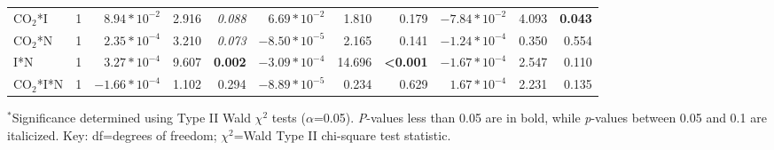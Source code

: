 \begin{landscape}
\begin{table}
{\begin{tabular}{p{3cm}p{0.5cm}p{1.75cm}p{1.5cm}p{1.5cm}p{1.75cm}p{1.5cm}p{1.5cm}p{1.75cm}p{1.5cm}p{1.5cm}}
            CO$_2$*I & \multicolumn{1}{r}{1}
            & \multicolumn{1}{r}{$8.94*10^{-2}$}     & \multicolumn{1}{r}{2.916}         & \multicolumn{1}{r}{\textit{0.088}}
            & \multicolumn{1}{r}{$6.69*10^{-2}$}     & \multicolumn{1}{r}{1.810}         & \multicolumn{1}{r}{0.179}
            & \multicolumn{1}{r}{$-7.84*10^{-2}$}     & \multicolumn{1}{r}{4.093}         & \multicolumn{1}{r}{\textbf{0.043}} 
            \\

            CO$_2$*N & \multicolumn{1}{r}{1}
            & \multicolumn{1}{r}{$2.35*10^{-4}$}     & \multicolumn{1}{r}{3.210}         & \multicolumn{1}{r}{\textit{0.073}}
            & \multicolumn{1}{r}{$-8.50*10^{-5}$}     & \multicolumn{1}{r}{2.165}         & \multicolumn{1}{r}{0.141}
            & \multicolumn{1}{r}{$-1.24*10^{-4}$}     & \multicolumn{1}{r}{0.350}         & \multicolumn{1}{r}{0.554} 
            \\

            I*N & \multicolumn{1}{r}{1}
            & \multicolumn{1}{r}{$3.27*10^{-4}$}     & \multicolumn{1}{r}{9.607}         & \multicolumn{1}{r}{\textbf{0.002}}
            & \multicolumn{1}{r}{$-3.09*10^{-4}$}     & \multicolumn{1}{r}{14.696}        & \multicolumn{1}{r}{\textbf{<0.001}}
            & \multicolumn{1}{r}{$-1.67*10^{-4}$}     & \multicolumn{1}{r}{2.547}         & \multicolumn{1}{r}{0.110} 
            \\

            CO$_2$*I*N & \multicolumn{1}{r}{1}
            & \multicolumn{1}{r}{$-1.66*10^{-4}$}     & \multicolumn{1}{r}{1.102}         & \multicolumn{1}{r}{0.294}
            & \multicolumn{1}{r}{$-8.89*10^{-5}$}     & \multicolumn{1}{r}{0.234}         & \multicolumn{1}{r}{0.629}
            & \multicolumn{1}{r}{$1.67*10^{-4}$}     & \multicolumn{1}{r}{2.231}         & \multicolumn{1}{r}{0.135} 
            \\
            \hline
    \end{tabular}}
    \label{tab:table5.2}
    \end{table}
\begin{singlespace}
\noindent $^*$Significance determined using Type II Wald $\chi^2$ tests ($\alpha$=0.05). \textit{P}-values less than 0.05 are in bold, while \textit{p}-values between 0.05 and 0.1 are italicized. Key: df=degrees of freedom; $\chi^2$=Wald Type II chi-square test statistic.
\end{singlespace}
\end{landscape}
\clearpage

